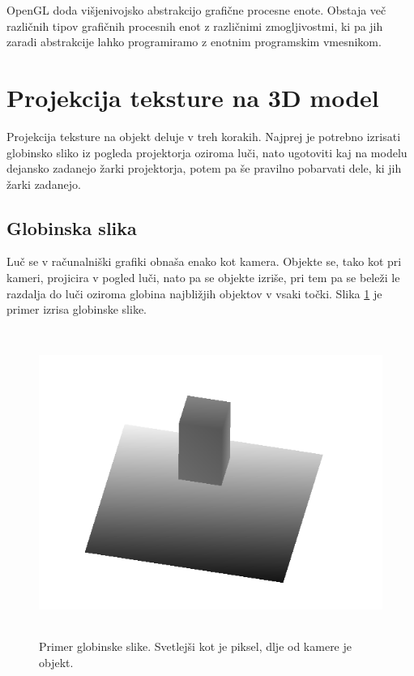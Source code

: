 \documentclass[a4paper, 12pt]{book}
\begin{document}
OpenGL doda višjenivojsko abstrakcijo grafične procesne enote. Obstaja več različnih tipov grafičnih procesnih enot z različnimi zmogljivostmi, ki pa jih zaradi abstrakcije lahko programiramo z enotnim programskim vmesnikom. 
\section{Projekcija teksture na 3D model}

Projekcija teksture na objekt deluje v treh korakih. Najprej je potrebno izrisati globinsko sliko iz pogleda projektorja oziroma luči, nato ugotoviti kaj na modelu dejansko zadanejo žarki projektorja, potem pa še pravilno pobarvati dele, ki jih žarki zadanejo.
\subsection*{Globinska slika}
Luč se v računalniški grafiki obnaša enako kot kamera. Objekte se, tako kot pri kameri, projicira v pogled luči, nato pa se objekte izriše, pri tem pa se beleži le razdalja do luči oziroma globina najbližjih objektov v vsaki točki. Slika \ref{globinskaslika} je primer izrisa globinske slike.

\begin{figure}[h]
\begin{center}
\includegraphics[width=12cm, height=10cm, keepaspectratio=true]{Globinska_slika.png}
\end{center}
\caption{Primer globinske slike. Svetlejši kot je piksel, dlje od kamere je objekt.}
\label{globinskaslika}
\end{figure}
\end{document}
